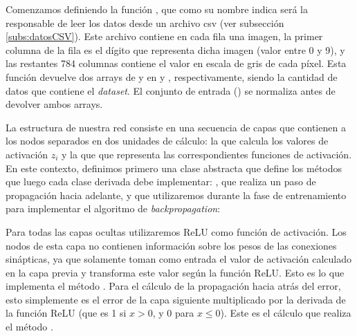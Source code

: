 
Comenzamos definiendo la función , que como su nombre indica será la responsable de leer los datos desde un archivo csv (ver subsección \ref{subs:datosCSV}). Este archivo contiene en cada fila una imagen, la primer columna de la fila es el dígito que representa dicha imagen (valor entre 0 y 9), y las restantes 784 columnas contiene el valor en escala de gris de cada píxel. Esta función devuelve dos arrays de  y  en  y , respectivamente, siendo  la cantidad de datos que contiene el \textit{dataset}. El conjunto de entrada () se normaliza antes de devolver ambos arrays.


La estructura de nuestra red consiste en una secuencia de capas que contienen a los nodos separados en dos unidades de cálculo: la que calcula los valores de activación $z_i$ y la que que representa las correspondientes funciones de activación. En este contexto, definimos primero una clase abstracta  que define los métodos que luego cada clase derivada debe implementar: , que realiza un paso de propagación hacia adelante, y  que utilizaremos durante la fase de entrenamiento para implementar el algoritmo de \textit{backpropagation}:


Para todas las capas ocultas utilizaremos ReLU como función de activación. Los nodos de esta capa no contienen información sobre los pesos de las conexiones sinápticas, ya que solamente toman como entrada el valor de activación calculado en la capa previa y transforma este valor según la función ReLU. Esto es lo que implementa el método . Para el cálculo de la propagación hacia atrás del error, esto simplemente es el error de la capa siguiente multiplicado por la derivada de la función ReLU (que es 1 si $x > 0$, y 0 para $x \leq 0$). Este es el cálculo que realiza el método . 



